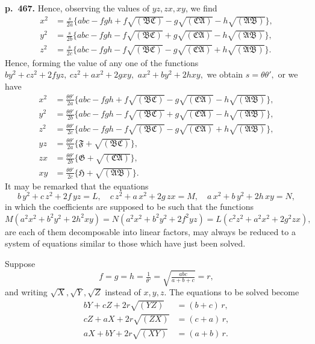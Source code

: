 \documentclass[11pt]{article}
\begin{document}
\bigskip
\noindent\textbf{p.~467.} Hence, observing the values of $yz, zx, xy$, we find
\[
\begin{aligned}
x^2 &= \tfrac{s}{2a}\{abc - fgh + f\sqrt{(\mathfrak{BC})} - g\sqrt{(\mathfrak{CA})} - h\sqrt{(\mathfrak{AB})}\},\\
y^2 &= \tfrac{s}{2b}\{abc - fgh - f\sqrt{(\mathfrak{BC})} + g\sqrt{(\mathfrak{CA})} - h\sqrt{(\mathfrak{AB})}\},\\
z^2 &= \tfrac{s}{2c}\{abc - fgh - f\sqrt{(\mathfrak{BC})} - g\sqrt{(\mathfrak{CA})} + h\sqrt{(\mathfrak{AB})}\}.
\end{aligned}
\]
Hence, forming the value of any one of the functions $by^2 + cz^2 + 2fyz,\ cz^2 + ax^2 + 2gxy,$ $ax^2 + by^2 + 2hxy,$ we obtain $s = \theta\theta',$ or we have
\[
\begin{aligned}
x^2 &= \tfrac{\theta\theta'}{2a}\{abc - fgh + f\sqrt{(\mathfrak{BC})} - g\sqrt{(\mathfrak{CA})} - h\sqrt{(\mathfrak{AB})}\},\\
y^2 &= \tfrac{\theta\theta'}{2b}\{abc - fgh - f\sqrt{(\mathfrak{BC})} + g\sqrt{(\mathfrak{CA})} - h\sqrt{(\mathfrak{AB})}\},\\
z^2 &= \tfrac{\theta\theta'}{2c}\{abc - fgh - f\sqrt{(\mathfrak{BC})} - g\sqrt{(\mathfrak{CA})} + h\sqrt{(\mathfrak{AB})}\},\\
yz &= \tfrac{\theta\theta'}{2a}\{\mathfrak{F} + \sqrt{(\mathfrak{BC})}\},\\
zx &= \tfrac{\theta\theta'}{2b}\{\mathfrak{G} + \sqrt{(\mathfrak{CA})}\},\\
xy &= \tfrac{\theta\theta'}{2c}\{\mathfrak{H} + \sqrt{(\mathfrak{AB})}\}.
\end{aligned}
\]
It may be remarked that the equations
\[ b\,y^2 + c\,z^2 + 2f\,yz = L,\quad c\,z^2 + a\,x^2 + 2g\,zx = M,\quad a\,x^2 + b\,y^2 + 2h\,xy = N, \]
in which the coefficients are supposed to be such that the functions $M(a^2 x^2 + b^2 y^2 + 2h^2 xy) = N(a^2 x^2 + b^2 y^2 + 2f^2 yz) = L(c^2 z^2 + a^2 x^2 + 2g^2 zx),$ are each of them decomposable into linear factors, may always be reduced to a system of equations similar to those which have just been solved.

Suppose
\[ f = g = h = \tfrac{1}{\theta'} = \sqrt{\tfrac{abc}{a + b + c}} = r, \]
and writing $\sqrt{X}, \sqrt{Y}, \sqrt{Z}$ instead of $x, y, z$. The equations to be solved become
\[
\begin{aligned}
bY + cZ + 2r\sqrt{(YZ)} &= (b + c)\,r,\\
cZ + aX + 2r\sqrt{(ZX)} &= (c + a)\,r,\\
aX + bY + 2r\sqrt{(XY)} &= (a + b)\,r.
\end{aligned}
\]
\end{document}

